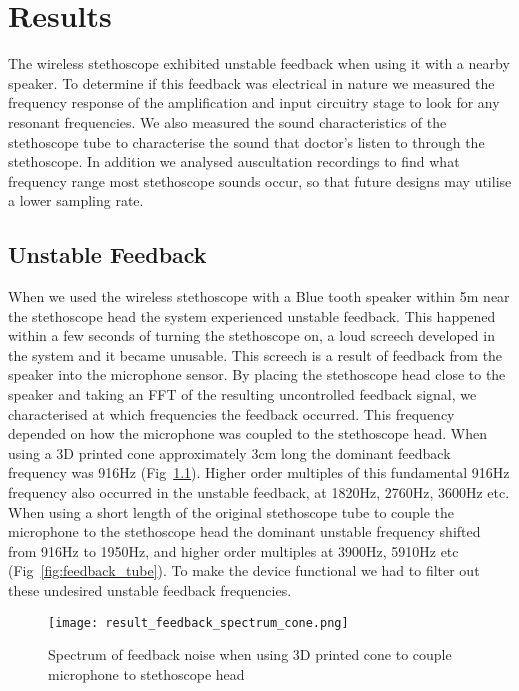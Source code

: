 \chapter{Results} \label{results}

The wireless stethoscope exhibited unstable feedback when using it with a nearby speaker. To determine if this feedback was electrical in nature we measured the frequency response of the amplification and input circuitry stage to look for any resonant frequencies. We also measured the sound characteristics of the stethoscope tube to characterise the sound that doctor's listen to through the stethoscope. In addition we analysed auscultation recordings to find what frequency range most stethoscope sounds occur, so that future designs may utilise a lower sampling rate. 

\section{Unstable Feedback} \label{feedback-freq}
When we used the wireless stethoscope with a Blue tooth speaker within 5m near the stethoscope head the system experienced unstable feedback. This happened within a few seconds of turning the stethoscope on, a loud screech developed in the system and it became unusable. This screech is a result of feedback from the speaker into the microphone sensor. By placing the stethoscope head close to the speaker and taking an FFT of the resulting uncontrolled feedback signal, we characterised at which frequencies the feedback occurred. This frequency depended on how the microphone was coupled to the stethoscope head. When using a 3D printed cone approximately 3cm long  the dominant feedback frequency was 916Hz (Fig~\ref{fig:feedback_cone}). Higher order multiples of this fundamental 916Hz frequency also occurred in the unstable feedback, at 1820Hz, 2760Hz, 3600Hz etc. When using a short length of the original stethoscope tube to couple the microphone to the stethoscope head the dominant unstable frequency shifted from 916Hz to 1950Hz, and higher order multiples at 3900Hz, 5910Hz etc (Fig~\ref{fig:feedback_tube}). To make the device functional we had to filter out these undesired unstable feedback frequencies.

\begin{figure}[!tbh]
	\centering
		\texttt{[image: result\_feedback\_spectrum\_cone.png]}
	\caption{Spectrum of feedback noise when using 3D printed cone to couple microphone to stethoscope head}
	\label{fig:feedback_cone}
\end{figure}

